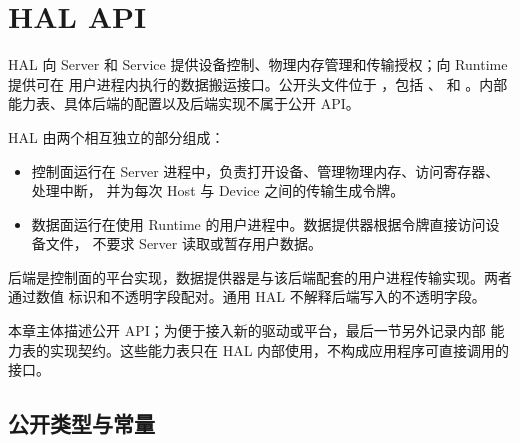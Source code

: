 \documentclass[../dayan_api_reference.tex]{subfiles}
\begin{document}
\section{HAL API}\label{sec:api-hal}

HAL 向 Server 和 Service 提供设备控制、物理内存管理和传输授权；向 Runtime 提供可在
用户进程内执行的数据搬运接口。公开头文件位于
，包括 、 和
。内部能力表、具体后端的配置以及后端实现不属于公开 API。

HAL 由两个相互独立的部分组成：

\begin{itemize}
  \item 控制面运行在 Server 进程中，负责打开设备、管理物理内存、访问寄存器、处理中断，
        并为每次 Host 与 Device 之间的传输生成令牌。
  \item 数据面运行在使用 Runtime 的用户进程中。数据提供器根据令牌直接访问设备文件，
        不要求 Server 读取或暂存用户数据。
\end{itemize}

后端是控制面的平台实现，数据提供器是与该后端配套的用户进程传输实现。两者通过数值
标识和不透明字段配对。通用 HAL 不解释后端写入的不透明字段。

本章主体描述公开 API；为便于接入新的驱动或平台，最后一节另外记录内部
 能力表的实现契约。这些能力表只在 HAL 内部使用，不构成应用程序可直接调用的
接口。

\subsection{公开类型与常量}
\end{document}
